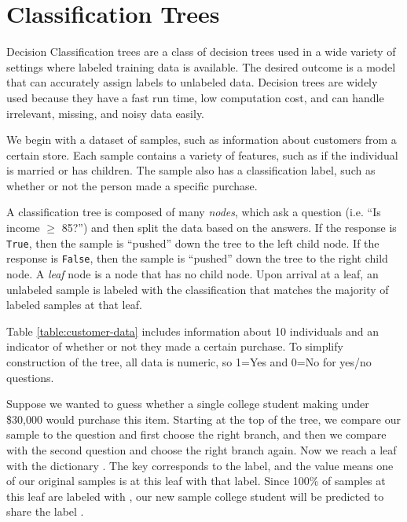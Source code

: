 
\section*{Classification Trees} %
Decision
Classification trees are a class of decision trees used in a wide variety of settings where labeled training data is available.
The desired outcome is a model that can accurately assign labels to unlabeled data.
Decision trees are widely used because they have a fast run time, low computation cost, and can handle irrelevant, missing, and noisy data easily.

We begin with a dataset of samples, such as information about customers from a certain store.
Each sample contains a variety of features, such as if the individual is married or has children.
The sample also has a classification label, such as whether or not the person made a specific purchase.

A classification tree is composed of many \emph{nodes}, which ask a question (i.e. ``Is income $\geq$ 85?'') and then split the data based on the answers.
If the response is \texttt{True}, then the sample is ``pushed'' down the tree to the left child node. If the response is \texttt{False}, then the sample is ``pushed'' down the tree to the right child node.
A \emph{leaf} node is a node that has no child node.
Upon arrival at a leaf, an unlabeled sample is labeled with the classification that matches the majority of labeled samples at that leaf.

Table \ref{table:customer-data} includes information about 10 individuals and an indicator of whether or not they made a certain purchase.
To simplify construction of the tree, all data is numeric, so 1=Yes and 0=No for yes/no questions.

Suppose we wanted to guess whether a single college student making under \$30,000 would purchase this item.
Starting at the top of the tree, we compare our sample to the question and first choose the right branch, and then we compare with the second question and choose the right branch again.
Now we reach a leaf with the dictionary .
The key  corresponds to the label, and the value  means one of our original samples is at this leaf with that label.
Since 100\% of samples at this leaf are labeled with , our new sample college student will be predicted to share the label .

